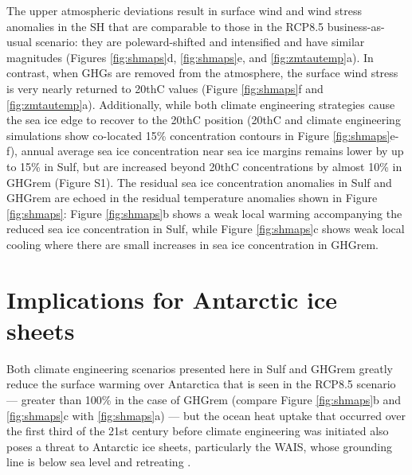 \documentclass{nature}
\begin{document}
The upper atmospheric deviations result in surface wind and wind stress anomalies in the SH that are comparable to those in the RCP8.5 business-as-usual scenario: they are poleward-shifted and intensified and have similar magnitudes (Figures \ref{fig:shmaps}d, \ref{fig:shmaps}e, and \ref{fig:zmtautemp}a). In contrast, when GHGs are removed from the atmosphere, the surface wind stress is very nearly returned to 20thC values (Figure \ref{fig:shmaps}f and \ref{fig:zmtautemp}a). Additionally, while both climate engineering strategies cause the sea ice edge to recover to the 20thC position (20thC and climate engineering simulations show co-located 15\% concentration contours in Figure \ref{fig:shmaps}e-f), annual average sea ice concentration near sea ice margins remains lower by up to 15\% in Sulf, but are increased beyond 20thC concentrations by almost 10\% in GHGrem (Figure S1). The residual sea ice concentration anomalies in Sulf and GHGrem are echoed in the residual temperature anomalies shown in Figure \ref{fig:shmaps}: Figure \ref{fig:shmaps}b shows a weak local warming accompanying the reduced sea ice concentration in Sulf, while Figure \ref{fig:shmaps}c shows weak local cooling where there are small increases in sea ice concentration in GHGrem. 

\section{Implications for Antarctic ice sheets}

Both climate engineering scenarios presented here in Sulf and GHGrem greatly reduce the surface warming over Antarctica that is seen in the RCP8.5 scenario --- greater than 100\% in the case of GHGrem (compare Figure \ref{fig:shmaps}b and \ref{fig:shmaps}c with \ref{fig:shmaps}a) --- but the ocean heat uptake that occurred over the first third of the 21st century before climate engineering was initiated also poses a threat to Antarctic ice sheets, particularly the WAIS, whose grounding line is below sea level \cite{joughin11} and retreating \cite{rignot14}. %
\end{document}
